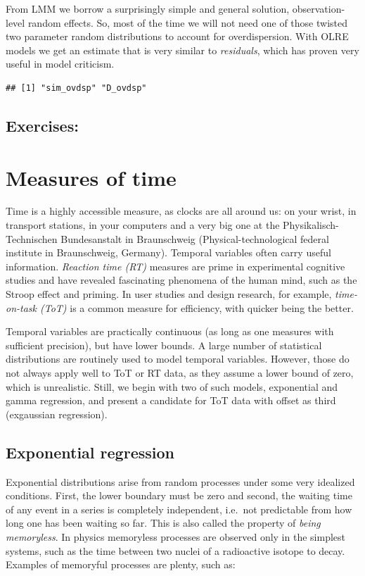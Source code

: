 \documentclass[]{svmono}
\begin{document}
From LMM we borrow a surprisingly simple and general solution,
observation-level random effects. So, most of the time we will not need
one of those twisted two parameter random distributions to account for
overdispersion. With OLRE models we get an estimate that is very similar
to \emph{residuals}, which has proven very useful in model criticism.

\begin{verbatim}
## [1] "sim_ovdsp" "D_ovdsp"
\end{verbatim}

\subsection{Exercises:}\label{exercises-8}

\section{Measures of time}\label{measures_of_time}

Time is a highly accessible measure, as clocks are all around us: on
your wrist, in transport stations, in your computers and a very big one
at the Physikalisch-Technischen Bundesanstalt in Braunschweig
(Physical-technological federal institute in Braunschweig, Germany).
Temporal variables often carry useful information. \emph{Reaction time
(RT)} measures are prime in experimental cognitive studies and have
revealed fascinating phenomena of the human mind, such as the Stroop
effect and priming. In user studies and design research, for example,
\emph{time-on-task (ToT)} is a common measure for efficiency, with
quicker being the better.

Temporal variables are practically continuous (as long as one measures
with sufficient precision), but have lower bounds. A large number of
statistical distributions are routinely used to model temporal
variables. However, those do not always apply well to ToT or RT data, as
they assume a lower bound of zero, which is unrealistic. Still, we begin
with two of such models, exponential and gamma regression, and present a
candidate for ToT data with offset as third (exgaussian regression).

\subsection{Exponential regression}\label{exponential-regression}

Exponential distributions arise from random processes under some very
idealized conditions. First, the lower boundary must be zero and second,
the waiting time of any event in a series is completely independent,
i.e.~not predictable from how long one has been waiting so far. This is
also called the property of \emph{being memoryless}. In physics
memoryless processes are observed only in the simplest systems, such as
the time between two nuclei of a radioactive isotope to decay. Examples
of memoryful processes are plenty, such as:
\end{document}
